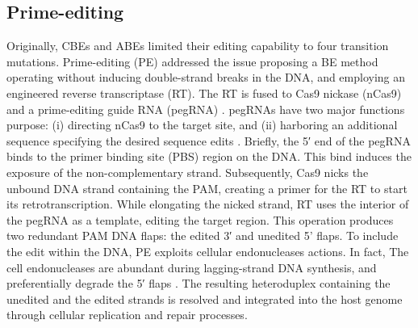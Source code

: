 \documentclass[a4paper, titlepage, openright]{book}
\begin{document}
\subsection{Prime-editing}
Originally, CBEs and ABEs limited their editing capability to four transition mutations. Prime-editing (PE) \citep{anzalone2019search} addressed the issue proposing a BE method operating without inducing double-strand breaks in the DNA, and employing an engineered reverse transcriptase (RT). The RT is fused to Cas9 nickase (nCas9) and a prime-editing guide RNA (pegRNA) \citep{anzalone2019search}. pegRNAs have two major functions purpose: (i) directing nCas9 to the target site, and (ii) harboring an additional sequence specifying the desired sequence edits \citep{anzalone2019search}. Briefly, the 5′ end of the pegRNA binds to the primer binding site (PBS) region on the DNA. This bind induces the exposure of the non-complementary strand. Subsequently, Cas9 nicks the unbound DNA strand containing the PAM, creating a primer for the RT to start its retrotranscription. While elongating the nicked strand, RT uses the interior of the pegRNA as a template, editing the target region. This operation produces two redundant PAM DNA flaps: the edited 3′ and unedited 5' flaps. To include the edit within the DNA, PE exploits cellular endonucleases actions. In fact, The cell endonucleases are abundant during lagging-strand DNA synthesis, and preferentially degrade the 5′ flaps \citep{kantor2020crispr}. The resulting heteroduplex containing the unedited and the edited strands is resolved and integrated into the host genome through cellular replication and repair processes.

\end{document}
